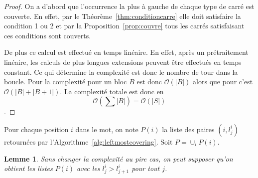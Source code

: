 \documentclass[10pt,letterpaper,oneside]{article}
\newtheorem{lemme}{Lemme}
\newcommand{\bigo}{\mathcal{O}}
\begin{document}
\begin{proof}
    On a d'abord que l'occurrence la plus à gauche de chaque type de carré est couverte. En effet, par le Théorème~\ref{thm:conditioncarre} elle doit satisfaire la condition 1 ou 2 et par la Proposition~\ref{prop:couvre} tous les carrés satisfaisant ces conditions sont couverts.
    
    De plus ce calcul est effectué en temps linéaire. En effet, après un prétraitement linéaire, les calculs de plus longues extensions peuvent être effectués en temps constant. Ce qui détermine la complexité est donc le nombre de tour dans la boucle. Pour  la complexité pour un bloc $B$ est donc $\bigo(|B|)$ alors que pour  c'est $\bigo(|B|+|B+1|)$. La complexité totale est donc en $$\bigo\left(\sum |B|\right)=\bigo(|S|)$$.
\end{proof}

Pour chaque position $i$ dans le mot, on note $P(i)$ la liste des paires $(i,l^i_j)$ retournées par l'Algorithme~\ref{alg:leftmostcovering}. Soit $P=\cup_i P(i)$.

\begin{lemme}
    Sans changer la complexité au pire cas, on peut supposer qu'on obtient les listes $P(i)$ avec les $l^i_j>l^i_{j+1}$ pour tout $j$.
\end{lemme}
\end{document}
